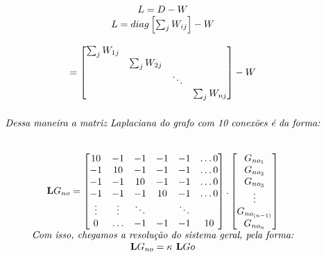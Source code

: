 \[
\begin{matrix}

\\
L = D - W \\
L = diag\left [  \sum_{j}W_{ij} \right ] - W\\
\\
= \begin{bmatrix}
\begin{matrix}
\sum_jW_{1j} &    & \\
  &  \sum_jW_{2j} &  & \\
  &  & \ddots & \\
  &          & & \sum_jW_{nj} 
\end{matrix}
\end{bmatrix}

- W
\\[6pt]
\\[6pt]
\textit{Dessa maneira a matriz Laplaciana do grafo com 10 conexões é da forma:} \\[6pt] \\[6pt]


\textbf{L}G_{no}=\begin{bmatrix}
\begin{matrix}
10 &  -1  & -1 &-1 &-1 &\ldots 0\\
-1  &  10 & -1 &-1 &-1 &\ldots  0\\
-1  &-1  & 10   &-1 &-1 &\ldots0\\
-1  &-1  &-1   &10 &-1 &\ldots0\\
\vdots & \vdots & \ddots &  &\ddots\\
0  &   \ldots&-1 & -1 &-1    &10
\end{matrix}
\end{bmatrix}
.
\begin{bmatrix}
\begin{matrix}
G_{no_1} \\
G_{no_2}  \\
G_{no_3} \\
$\vdots$\\
G_{no_{(n-1)}} \\
G_{no_n}  \\
\end{matrix}
\end{bmatrix}
\\%
\textit{Com isso, chegamos a resolução do sistema geral, pela forma:} 
\\%
\textbf{L}G_{no} = \kappa\textbf{ L}G{o}
\end{matrix}
\]

